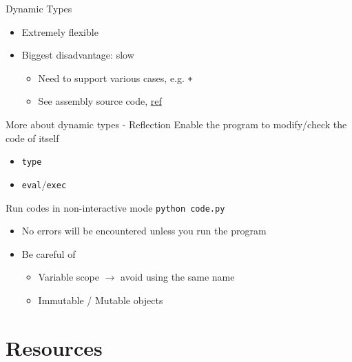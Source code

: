 \documentclass{../TexTemplate/myslide}
\begin{document}
\begin{frame}[fragile]{Dynamic Types}
\begin{itemize}
\item Extremely flexible
\item Biggest disadvantage: slow
\begin{itemize}
	\item Need to support various cases, e.g. \verb'+'
	\item See assembly source code, \href{https://www.zhihu.com/question/25307289/answer/104643646}{ref}
\end{itemize}
\end{itemize}
\end{frame}

\begin{frame}[fragile]{More about dynamic types - Reflection}
Enable the program to modify/check the code of itself
\begin{itemize}
	\item \verb'type'
	\item \verb'eval'/\verb'exec'
\end{itemize}
\end{frame}

\begin{frame}[fragile]{Run codes in non-interactive mode}
\verb'python code.py'
\begin{itemize}
\item No errors will be encountered unless you run the program
\item Be careful of
\begin{itemize}
	\item Variable scope $\to$ avoid using the same name
	\item Immutable / Mutable objects
\end{itemize}
\end{itemize}
\end{frame}

\section{Resources}
\begin{frame}
\sectionpage
\end{frame}
\end{document}
